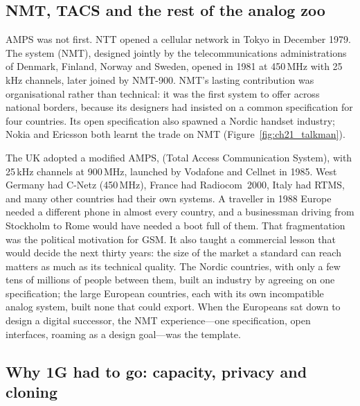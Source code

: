 \subsection{NMT, TACS and the rest of the analog zoo}

AMPS was not first. NTT opened a cellular network in Tokyo in December 1979. The
 system (NMT), designed jointly by the telecommunications
administrations of Denmark, Finland, Norway and Sweden, opened in 1981 at 450\,MHz with 25\,kHz
channels, later joined by NMT-900. NMT's lasting contribution was organisational rather than
technical: it was the first system to offer  across national borders, because its
designers had insisted on a common specification for four countries. Its open specification also
spawned a Nordic handset industry; Nokia and Ericsson both learnt the trade on NMT
(Figure~\ref{fig:ch21_talkman}).

The UK adopted a modified AMPS,  (Total Access Communication System), with 25\,kHz
channels at 900\,MHz, launched by Vodafone and Cellnet in 1985. West Germany had C-Netz (450\,MHz),
France had Radiocom~2000, Italy had RTMS, and many other countries had their own systems. A
traveller in 1988 Europe needed a different phone in almost every country, and a businessman driving
from Stockholm to Rome would have needed a boot full of them. That fragmentation was the political
motivation for GSM. It also taught a commercial lesson that would decide the next thirty years:
the size of the market a standard can reach matters as much as its technical quality. The Nordic
countries, with only a few tens of millions of people between them, built an industry by agreeing
on one specification; the large European countries, each with its own incompatible analog system,
built none that could export. When the Europeans sat down to design a digital successor, the NMT
experience---one specification, open interfaces, roaming as a design goal---was the template.


\subsection{Why 1G had to go: capacity, privacy and cloning}

